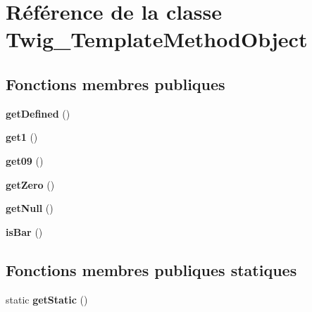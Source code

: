 \hypertarget{class_twig___template_method_object}{}\section{Référence de la classe Twig\+\_\+\+Template\+Method\+Object}
\label{class_twig___template_method_object}
\subsection*{Fonctions membres publiques}
\begin{DoxyCompactItemize}
\item 
{\bfseries get\+Defined} ()\hypertarget{class_twig___template_method_object_ad5a5a762cbf6457378245b55aa113d31}{}\label{class_twig___template_method_object_ad5a5a762cbf6457378245b55aa113d31}

\item 
{\bfseries get1} ()\hypertarget{class_twig___template_method_object_ac354301c2e72d7cf5f261dc8edd30c22}{}\label{class_twig___template_method_object_ac354301c2e72d7cf5f261dc8edd30c22}

\item 
{\bfseries get09} ()\hypertarget{class_twig___template_method_object_a405c29c30ac14298162e7b4aa44325d9}{}\label{class_twig___template_method_object_a405c29c30ac14298162e7b4aa44325d9}

\item 
{\bfseries get\+Zero} ()\hypertarget{class_twig___template_method_object_a30235396cad4c27db5ffc4874bc66c17}{}\label{class_twig___template_method_object_a30235396cad4c27db5ffc4874bc66c17}

\item 
{\bfseries get\+Null} ()\hypertarget{class_twig___template_method_object_ae02e5aabd0ccbc4beb923d06bea9c363}{}\label{class_twig___template_method_object_ae02e5aabd0ccbc4beb923d06bea9c363}

\item 
{\bfseries is\+Bar} ()\hypertarget{class_twig___template_method_object_abc3db26555219b7c182172b90bd5e6d9}{}\label{class_twig___template_method_object_abc3db26555219b7c182172b90bd5e6d9}

\end{DoxyCompactItemize}
\subsection*{Fonctions membres publiques statiques}
\begin{DoxyCompactItemize}
\item 
static {\bfseries get\+Static} ()\hypertarget{class_twig___template_method_object_a3bc5b716ec12bc28cfe8bee492f4e656}{}\label{class_twig___template_method_object_a3bc5b716ec12bc28cfe8bee492f4e656}

\end{DoxyCompactItemize}
